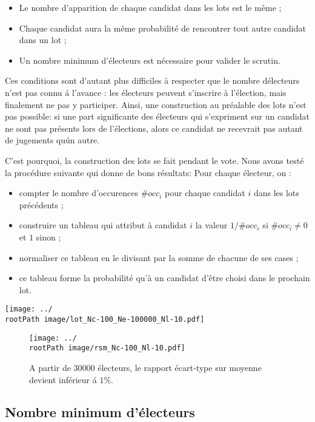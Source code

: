 \documentclass[conference]{IEEEtran}
\newcommand*{\rootPath}{../}
\begin{document}
\begin{itemize}
  \item Le nombre d'apparition de chaque candidat dans les lots est le m\^eme ;
  \item Chaque candidat aura la m\^eme probabilit\'e de rencontrer tout autre candidat dans un lot ;
  \item Un nombre minimum d'\'electeurs est n\'ecessaire pour valider le scrutin.
\end{itemize}

Ces conditions sont d'autant plus difficiles \`a respecter que le nombre d\'electeurs n'est pas connu \'a l'avance : les \'electeurs peuvent s'inscrire \`a l'\'election, mais finalement ne pas y participer. Ainsi, une construction au pr\'ealable des lots n'est pas possible: si une part significante des \'electeurs qui s'expriment sur un candidat ne sont pas pr\'esents lors de l'\'elections, alors ce candidat ne recevrait pas autant de jugements qu\'un autre.

C'est pourquoi, la construction des lots se fait pendant le vote. Nous avons test\'e la proc\'edure suivante qui donne de bons r\'esultats:
Pour chaque \'electeur, on :
\begin{itemize}
  \item compter le nombre d'occurences $\#occ_i$ pour chaque candidat $i$ dans les lots pr\'ec\'edents ;
  \item construire un tableau qui attribut \`a candidat $i$ la valeur $1/\#occ_i$ si $\#occ_i \ne 0$ et $1$ sinon ;
  \item normaliser ce tableau en le divisant par la somme de chacune de ses cases ;
  \item ce tableau forme la probabilit\'e qu'\`a un candidat d'\^etre choisi dans le prochain lot.
\end{itemize}

\begin{figure*}[!ht]
  \centering
  \texttt{[image: ../\\rootPath image/lot\_Nc-100\_Ne-100000\_Nl-10.pdf]}
  \caption{Avec 100000 \'electeurs et 100 candidats, chaque candidat apparait autant de fois que les autres candidats dans les lots}
  \label{fig:scaling}
\end{figure*}

\begin{figure}[!ht]
  \centering
  \texttt{[image: ../\\rootPath image/rsm\_Nc-100\_Nl-10.pdf]}
  \caption{A partir de 30000 \'electeurs, le rapport \'ecart-type sur moyenne devient inf\'erieur \'a $1\%$.}
  \label{fig:scaling}
\end{figure}

\subsection{Nombre minimum d'\'electeurs}
\end{document}
